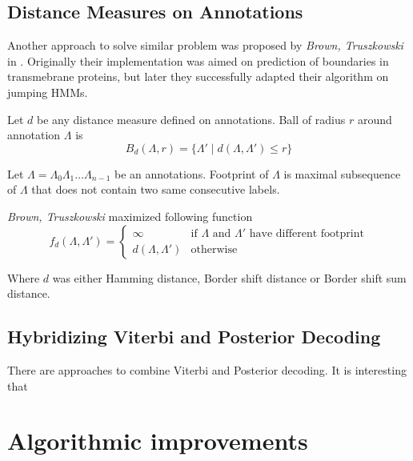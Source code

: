 \subsection{Distance Measures on Annotations}

Another approach to solve similar problem was proposed by {\it Brown,
Truszkowski} in \cite{}. Originally their implementation was aimed on prediction
of boundaries in transmebrane proteins\cite{}, but later they successfully
adapted their algorithm on jumping HMMs\cite{}.

\begin{definition}
Let $d$ be any distance measure defined on annotations. Ball of radius $r$
around annotation $\Lambda$ is 
\begin{equation}
B_d(\Lambda,r) = \{\Lambda'\mid d(\Lambda,\Lambda')\leq r\}
\end{equation}
\end{definition}

\begin{definition}
Let $\Lambda=\Lambda_0\Lambda_1\dots\Lambda_{n-1}$ be an annotations. Footprint
of $\Lambda$ is maximal subsequence of $\Lambda$ that does not contain two same
consecutive labels.
\end{definition}

{\it Brown,
Truszkowski} maximized following function
\begin{equation}
f_d(\Lambda,\Lambda') = 
\begin{cases}
\infty & \text{if $\Lambda$ and $\Lambda'$ have different footprint}\\
d(\Lambda,\Lambda') & \text{otherwise}
\end{cases}
\end{equation}

Where $d$ was either Hamming distance, Border shift distance or Border shift sum
distance\cite{}.


\subsection{Hybridizing Viterbi and Posterior Decoding}

There are approaches to combine Viterbi and Posterior decoding. It is
interesting that 


\section{Algorithmic improvements}













